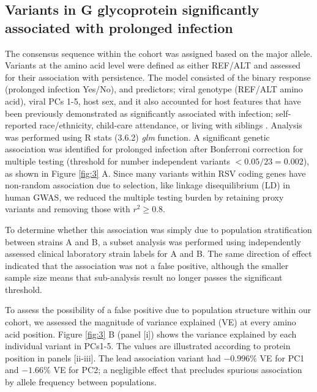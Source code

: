 \documentclass{article} %
\begin{document}
\subsection{Variants in G glycoprotein significantly associated with prolonged infection}
The consensus sequence within the cohort was assigned based on the major allele.
Variants at the amino acid level were defined as either REF/ALT and assessed for their association with persistence.
The model consisted of
the binary response (prolonged infection Yes/No),
and predictors; viral genotype (REF/ALT amino acid), viral PCs 1-5, host sex, and it also accounted for host features that have been previously demonstrated as significantly associated with infection;
self-reported race/ethnicity, child-care attendance, or living with siblings
\cite{hall1976respiratory}.
Analysis was performed using R stats (3.6.2) \textit{glm} function. 
A significant genetic association was identified for prolonged infection after Bonferroni correction for multiple testing (threshold for number independent variants $<0.05/23=0.002$), 
as shown in 
Figure \ref{fig:3} A. 
Since many variants within RSV coding genes have non-random association due to selection, like linkage disequilibrium (LD) in human GWAS, 
we reduced the multiple testing burden by retaining proxy variants and removing those with
$r^2 \ge 0.8$.

To determine whether this association was simply due to population stratification between strains A and B, a subset analysis was performed using independently assessed clinical laboratory strain labels for A and B.
The same direction of effect indicated that the association was not a false positive, although the smaller sample size means that sub-analysis result no longer passes the significant threshold. 

To assess the possibility of a false positive due to population structure within our cohort,
we assessed the magnitude of variance explained (VE) at every amino acid position.
Figure \ref{fig:3} B (panel [i]) shows the variance explained by each individual variant in PCs1-5.
The values are illustrated according to protein position in panels [ii-iii].
The lead association variant had 
$-0.996\%$ VE for PC1 and $-1.66\%$ VE for PC2; 
a negligible effect that precludes spurious association by allele frequency between populations.
\end{document}
